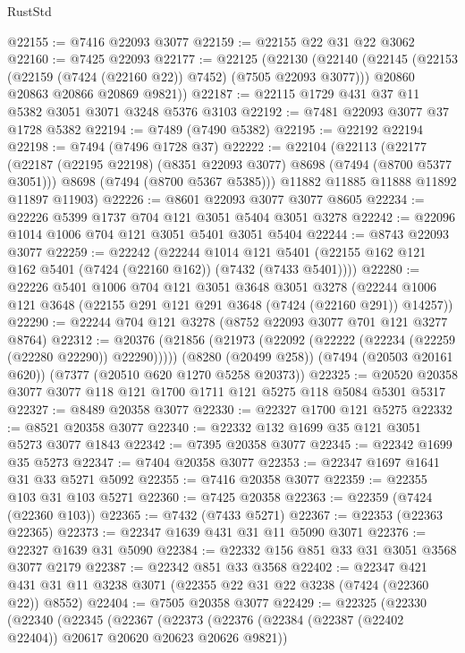 \begin{lexlean}{RustStd}
\begin{coremodule}
@22155 := @7416 @22093 @3077
@22159 := @22155 @22 @31 @22 @3062
@22160 := @7425 @22093
@22177 := @22125
    (@22130
      (@22140
        (@22145 (@22153 (@22159 (@7424 (@22160 @22)) @7452) (@7505 @22093 @3077)))
        @20860
        @20863
        @20866
        @20869
        @9821))
@22187 := @22115 @1729 @431 @37 @11 @5382 @3051 @3071 @3248 @5376 @3103
@22192 := @7481 @22093 @3077 @37 @1728 @5382
@22194 := @7489 (@7490 @5382)
@22195 := @22192 @22194
@22198 := @7494 (@7496 @1728 @37)
@22222 := @22104
    (@22113
      (@22177
        (@22187 (@22195 @22198) (@8351 @22093 @3077) @8698 (@7494 (@8700 @5377 @3051)))
        @8698
        (@7494 (@8700 @5367 @5385)))
      @11882
      @11885
      @11888
      @11892
      @11897
      @11903)
@22226 := @8601 @22093 @3077 @3077 @8605
@22234 := @22226 @5399 @1737 @704 @121 @3051 @5404 @3051 @3278
@22242 := @22096 @1014 @1006 @704 @121 @3051 @5401 @3051 @5404
@22244 := @8743 @22093 @3077
@22259 := @22242
    (@22244
      @1014
      @121
      @5401
      (@22155 @162 @121 @162 @5401 (@7424 (@22160 @162)) (@7432 (@7433 @5401))))
@22280 := @22226
    @5401
    @1006
    @704
    @121
    @3051
    @3648
    @3051
    @3278
    (@22244 @1006 @121 @3648 (@22155 @291 @121 @291 @3648 (@7424 (@22160 @291)) @14257))
@22290 := @22244 @704 @121 @3278 (@8752 @22093 @3077 @701 @121 @3277 @8764)
@22312 := @20376
    (@21856 (@21973 (@22092 (@22222 (@22234 (@22259 (@22280 @22290)) @22290)))))
    (@8280 (@20499 @258))
    (@7494 (@20503 @20161 @620))
    (@7377 (@20510 @620 @1270 @5258 @20373))
@22325 := @20520 @20358 @3077 @3077 @118 @121 @1700 @1711 @121 @5275 @118 @5084 @5301 @5317
@22327 := @8489 @20358 @3077
@22330 := @22327 @1700 @121 @5275
@22332 := @8521 @20358 @3077
@22340 := @22332 @132 @1699 @35 @121 @3051 @5273 @3077 @1843
@22342 := @7395 @20358 @3077
@22345 := @22342 @1699 @35 @5273
@22347 := @7404 @20358 @3077
@22353 := @22347 @1697 @1641 @31 @33 @5271 @5092
@22355 := @7416 @20358 @3077
@22359 := @22355 @103 @31 @103 @5271
@22360 := @7425 @20358
@22363 := @22359 (@7424 (@22360 @103))
@22365 := @7432 (@7433 @5271)
@22367 := @22353 (@22363 @22365)
@22373 := @22347 @1639 @431 @31 @11 @5090 @3071
@22376 := @22327 @1639 @31 @5090
@22384 := @22332 @156 @851 @33 @31 @3051 @3568 @3077 @2179
@22387 := @22342 @851 @33 @3568
@22402 := @22347 @421 @431 @31 @11 @3238 @3071 (@22355 @22 @31 @22 @3238 (@7424 (@22360 @22)) @8552)
@22404 := @7505 @20358 @3077
@22429 := @22325
    (@22330
      (@22340
        (@22345
          (@22367
            (@22373
              (@22376 (@22384 (@22387 (@22402 @22404)) @20617 @20620 @20623 @20626 @9821))

\end{coremodule}
\end{lexlean}
